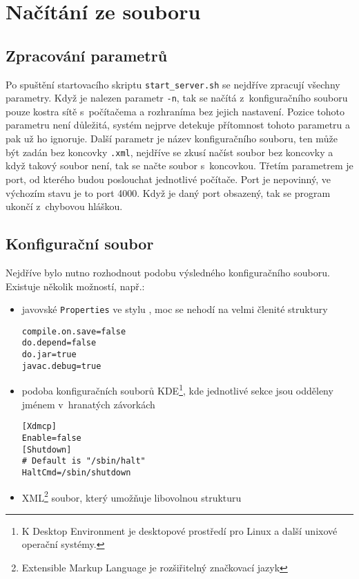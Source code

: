 \section{Načítání ze souboru} \label{xml_soubor}
\subsection{Zpracování parametrů}
Po spuštění startovacího skriptu \verb|start_server.sh| se nejdříve zpracují všechny parametry. Když je nalezen parametr \verb|-n|, tak se načítá z~konfiguračního souboru pouze kostra sítě s~počítačema a rozhraníma bez jejich nastavení. Pozice tohoto parametru není důležitá, systém nejprve detekuje přítomnost tohoto parametru a pak už ho ignoruje. Další parametr je název konfiguračního souboru, ten může být zadán bez koncovky \verb|.xml|, nejdříve se zkusí načíst soubor bez koncovky a když takový soubor není, tak se načte soubor s~koncovkou. Třetím parametrem je port, od kterého budou poslouchat jednotlivé počítače. Port je nepovinný, ve výchozím stavu je to port 4000. Když je daný port obsazený, tak se program ukončí z~chybovou hláškou.


\subsection{Konfigurační soubor}
Nejdříve bylo nutno rozhodnout podobu výsledného konfiguračního souboru. Existuje několik možností, např.:
\begin{itemize}
 \item javovské \verb|Properties| ve stylu , moc se nehodí na velmi členité struktury
\begin{verbatim}
compile.on.save=false
do.depend=false
do.jar=true
javac.debug=true
\end{verbatim} 

 \item podoba konfiguračních souborů KDE\footnote{K Desktop Environment je desktopové prostředí pro Linux a další unixové operační systémy.}, kde jednotlivé sekce jsou odděleny jménem v~hranatých závorkách
\begin{verbatim}
[Xdmcp]
Enable=false
[Shutdown]
# Default is "/sbin/halt"
HaltCmd=/sbin/shutdown
\end{verbatim} 

 \item XML\footnote{Extensible Markup Language je rozšiřitelný značkovací jazyk} soubor, který umožňuje libovolnou strukturu
\end{itemize}

